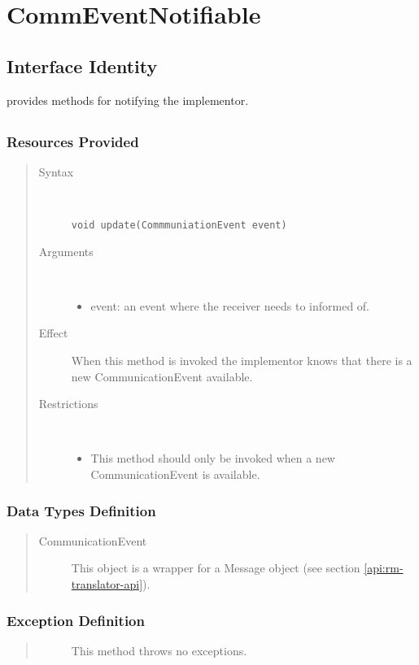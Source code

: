 \section{CommEventNotifiable}
\label{api:rm-trame-notifiable}

\subsection{Interface Identity}

\npar {} provides methods for notifying the
implementor.

\subsection{}

\subsubsection{Resources Provided}

\begin{quote}
	\begin{description}
		\item[Syntax] \
		\begin{verbatim}
void update(CommmuniationEvent event)
		\end{verbatim}
		\item[Arguments] \
		\begin{itemize}
		  \item event: an event where the receiver needs to informed of.
		\end{itemize}
		\item[Effect] When this method is invoked the implementor knows that there is
		a new CommunicationEvent available.
		\item[Restrictions] \
		\begin{itemize}
		  \item This method should only be invoked when a new CommunicationEvent is
		  available.
		\end{itemize}
	\end{description} 
\end{quote}

\subsubsection{Data Types Definition}

\begin{quote}
	\begin{description}
		\item[CommunicationEvent] This object is a wrapper for a Message object (see
		section \ref{api:rm-translator-api}).
	\end{description} 
\end{quote}

\subsubsection{Exception Definition} 

\begin{quote}
	\begin{description}
		\item[] This method throws no exceptions.
	\end{description} 
\end{quote}